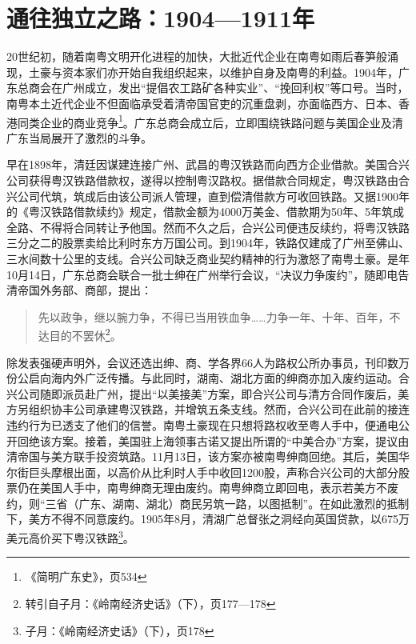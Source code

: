 \section{通往独立之路：1904—1911年}

20世纪初，随着南粤文明开化进程的加快，大批近代企业在南粤如雨后春笋般涌现，土豪与资本家们亦开始自我组织起来，以维护自身及南粤的利益。1904年，广东总商会在广州成立，发出“提倡农工路矿各种实业”、“挽回利权”等口号。当时，南粤本土近代企业不但面临承受着清帝国官吏的沉重盘剥，亦面临西方、日本、香港同类企业的商业竞争\footnote{《简明广东史》，页534}。广东总商会成立后，立即围绕铁路问题与美国企业及清广东当局展开了激烈的斗争。

早在1898年，清廷因谋建连接广州、武昌的粤汉铁路而向西方企业借款。美国合兴公司获得粤汉铁路借款权，遂得以控制粤汉路权。据借款合同规定，粤汉铁路由合兴公司代筑，筑成后由该公司派人管理，直到偿清借款方可收回铁路。又据1900年的《粤汉铁路借款续约》规定，借款金额为4000万美金、借款期为50年、5年筑成全路、不得将合同转让予他国。然而不久之后，合兴公司便违反续约，将粤汉铁路三分之二的股票卖给比利时东方万国公司。到1904年，铁路仅建成了广州至佛山、三水间数十公里的支线。合兴公司缺乏商业契约精神的行为激怒了南粤土豪。是年10月14日，广东总商会联合一批士绅在广州举行会议，“决议力争废约”，随即电告清帝国外务部、商部，提出：

\begin{quote}

先以政争，继以腕力争，不得已当用铁血争……力争一年、十年、百年，不达目的不罢休\footnote{转引自子月：《岭南经济史话》（下），页177—178}。

\end{quote}

除发表强硬声明外，会议还选出绅、商、学各界66人为路权公所办事员，刊印数万份公启向海内外广泛传播。与此同时，湖南、湖北方面的绅商亦加入废约运动。合兴公司随即派员赴广州，提出“以美接美”方案，即合兴公司与清方合同作废后，美方另组织协丰公司承建粤汉铁路，并增筑五条支线。然而，合兴公司在此前的接连违约行为已透支了他们的信誉。南粤土豪现在只想将路权收至粤人手中，便通电公开回绝该方案。接着，美国驻上海领事古诺又提出所谓的“中美合办”方案，提议由清帝国与美方联手投资筑路。11月13日，该方案亦被南粤绅商回绝。其后，美国华尔街巨头摩根出面，以高价从比利时人手中收回1200股，声称合兴公司的大部分股票仍在美国人手中，南粤绅商无理由废约。南粤绅商立即回电，表示若美方不废约，则“三省（广东、湖南、湖北）商民另筑一路，以图抵制”。在如此激烈的抵制下，美方不得不同意废约。1905年8月，清湖广总督张之洞经向英国贷款，以675万美元高价买下粤汉铁路\footnote{子月：《岭南经济史话》（下），页178}。

